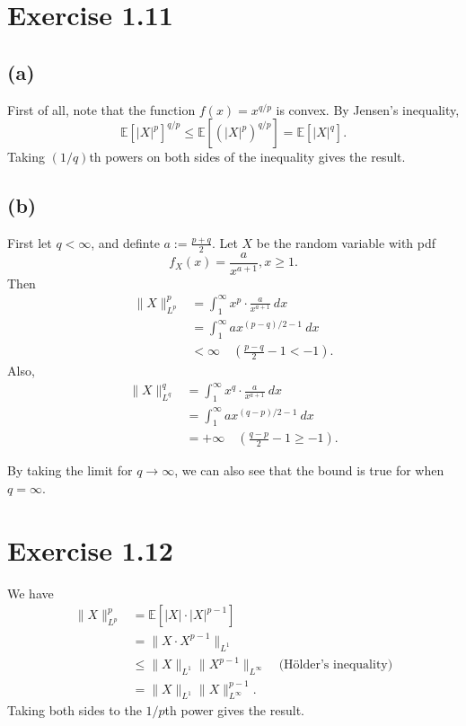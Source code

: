 \newpage
\section*{Exercise 1.11}
\subsection*{(a)}
First of all, note that the function $f(x) = x^{q/p}$ is convex. By Jensen's inequality, 
\[ \mathbb{E}\left[ |X|^p \right]^{q/p} \leq \mathbb{E}\left[ (|X|^p)^{q/p} \right] 
= \mathbb{E}\left[ |X|^q \right]. \]
Taking $(1/q)$th powers on both sides of the inequality gives the result.

\subsection*{(b)}
First let $q < \infty$, and definte $a := \frac{p + q}{2}$. Let $X$ be the random variable with pdf 
\[ f_X(x) = \frac{a}{x^{a + 1}}, x \geq 1.  \]
Then 
\begin{align*}
	\lVert X \rVert_{L^p}^p
	&= \int_{1}^{\infty} x^p \cdot \frac{a}{x^{a + 1}} \ dx \\
	&= \int_{1}^{\infty} ax^{(p-q)/2 - 1} \ dx \\
	&< \infty \quad (\frac{p - q}{2} - 1 < -1).
\end{align*}
Also, 
\begin{align*}
	\lVert X \rVert_{L^q}^q
	&= \int_{1}^{\infty} x^q \cdot \frac{a}{x^{a + 1}} \ dx \\
	&= \int_{1}^{\infty} ax^{(q-p)/2 - 1} \ dx \\
	&= +\infty \quad (\frac{q - p}{2} - 1 \geq -1).
\end{align*}

By taking the limit for $q \to \infty$, we can also see that the bound is true for when $q = \infty$.


\newpage
\section*{Exercise 1.12}
We have 
\begin{align*}
	\lVert X \rVert_{L^p}^p 
	&= \mathbb{E}\left[ |X| \cdot |X|^{p - 1} \right] \\
	&= \lVert X \cdot X^{p - 1} \rVert_{L^1} \\
	&\leq \lVert X \rVert_{L^1} \lVert X^{p - 1} \rVert_{L^{\infty}} \quad \text{(Hölder's inequality)} \\
	&= \lVert X \rVert_{L^1} \lVert X \rVert_{L^{\infty}}^{p - 1}.
\end{align*}
Taking both sides to the $1/p$th power gives the result.


